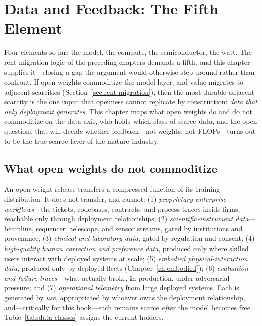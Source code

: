 \chapter[Data and Feedback: The Fifth Element]{Data and Feedback: The Fifth Element}
\label{ch:data}

Four elements so far: the model, the compute, the semiconductor, the watt. The rent-migration logic of the preceding chapters demands a fifth, and this chapter supplies it---closing a gap the argument would otherwise step around rather than confront. If open weights commoditize the model layer, and value migrates to adjacent scarcities (Section~\ref{sec:rent-migration}), then the most durable adjacent scarcity is the one input that openness cannot replicate by construction: \emph{data that only deployment generates}. This chapter maps what open weights do and do not commoditize on the data axis, who holds which class of scarce data, and the open questions that will decide whether feedback---not weights, not FLOPs---turns out to be the true scarce layer of the mature industry.

\section{What open weights do not commoditize}
\label{sec:data-classes}

An open-weight release transfers a compressed function of its training distribution. It does not transfer, and cannot: (1) \emph{proprietary enterprise workflows}---the tickets, codebases, contracts, and process traces inside firms, reachable only through deployment relationships; (2) \emph{scientific-instrument data}---beamline, sequencer, telescope, and sensor streams, gated by institutions and provenance; (3) \emph{clinical and laboratory data}, gated by regulation and consent; (4) \emph{high-quality human correction and preference data}, produced only where skilled users interact with deployed systems at scale; (5) \emph{embodied physical-interaction data}, produced only by deployed fleets (Chapter~\ref{ch:embodied}); (6) \emph{evaluation and failure traces}---what actually broke, in production, under adversarial pressure; and (7) \emph{operational telemetry} from large deployed systems. Each is generated by \emph{use}, appropriated by whoever owns the deployment relationship, and---critically for this book---each remains scarce \emph{after} the model becomes free. Table~\ref{tab:data-classes} assigns the current holders.

